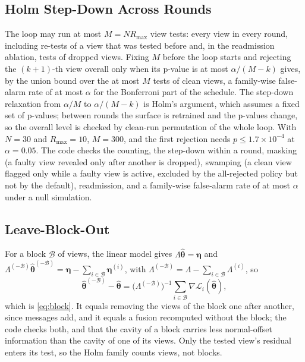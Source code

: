 \subsection{Holm Step-Down Across Rounds}
The loop may run at most $M=NR_{\max}$ view tests: every view in every round, including re-tests of a
view that was tested before and, in the readmission ablation, tests of dropped views. Fixing $M$ before
the loop starts and rejecting the $(k{+}1)$-th view overall only when its p-value is at most
$\alpha/(M-k)$ gives, by the union bound over the at most $M$ tests of clean views, a family-wise
false-alarm rate of at most $\alpha$ for the Bonferroni part of the schedule. The step-down relaxation
from $\alpha/M$ to $\alpha/(M-k)$ is Holm's argument, which assumes a fixed set of p-values; between rounds
the surface is retrained and the p-values change, so the overall level is checked by clean-run
permutation of the whole loop. With $N=30$ and $R_{\max}=10$, $M=300$, and the first rejection needs
$p\le1.7\times10^{-4}$ at $\alpha=0.05$. The code checks the counting, the step-down within a round,
masking (a faulty view revealed only after another is dropped), swamping (a clean view flagged only while a
faulty view is active, excluded by the all-rejected policy but not by the default), readmission, and a
family-wise false-alarm rate of at most $\alpha$ under a null simulation.

\subsection{Leave-Block-Out}
For a block $\mathcal{B}$ of views, the linear model gives $\Lambda\hat{\boldsymbol\theta}=\boldsymbol\eta$ and
$\Lambda^{(-\mathcal{B})}\hat{\boldsymbol\theta}^{(-\mathcal{B})}=\boldsymbol\eta-\sum_{i\in\mathcal{B}}\boldsymbol\eta^{(i)}$, with
$\Lambda^{(-\mathcal{B})}=\Lambda-\sum_{i\in\mathcal{B}}\Lambda^{(i)}$, so
\[
\hat{\boldsymbol\theta}^{(-\mathcal{B})}-\hat{\boldsymbol\theta}=\bigl(\Lambda^{(-\mathcal{B})}\bigr)^{-1}\sum_{i\in\mathcal{B}}\nabla\mathcal{L}_i(\hat{\boldsymbol\theta}),
\]
which is \eqref{eq:block}. It equals removing the views of the block one after another, since messages add,
and it equals a fusion recomputed without the block; the code checks both, and that the cavity of a block
carries less normal-offset information than the cavity of one of its views. Only the tested view's
residual enters its test, so the Holm family counts views, not blocks.

